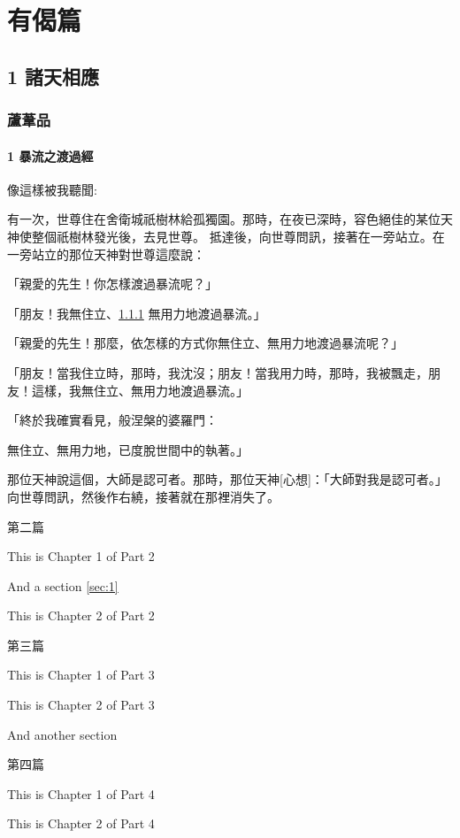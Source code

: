 \documentclass[a5paper,12pt]{book}
\begin{document}

\part[sort=有]{有偈篇}

\chapter{1 諸天相應}\label{ch:1-諸天相應}


\section{蘆葦品}\label{sec:蘆葦品}

\subsection{1 暴流之渡過經}\label{subsec:1}

像這樣被我聽聞:

有一次，世尊住在舍衛城祇樹林給孤獨園。那時，在夜已深時，容色絕佳的某位天神使整個祇樹林發光後，去見世尊。
抵達後，向世尊問訊，接著在一旁站立。在一旁站立的那位天神對世尊這麼說：

「親愛的先生！你怎樣渡過暴流呢？」

「朋友！我無住立、\ref{subsec:1} 無用力地渡過暴流。」

「親愛的先生！那麼，依怎樣的方式你無住立、無用力地渡過暴流呢？」

「朋友！當我住立時，那時，我沈沒；朋友！當我用力時，那時，我被飄走，朋友！這樣，我無住立、無用力地渡過暴流。」

「終於我確實看見，般涅槃的婆羅門：

無住立、無用力地，已度脫世間中的執著。」

那位天神說這個，大師是認可者。那時，那位天神[心想]：「大師對我是認可者。」向世尊問訊，然後作右繞，接著就在那裡消失了。

\clearpage

第二篇
This is Chapter 1 of Part 2
And a section \ref{sec:1}
\clearpage
This is Chapter 2 of Part 2
\clearpage

第三篇
This is Chapter 1 of Part 3
\clearpage
This is Chapter 2 of Part 3
And another section
\clearpage
第四篇
This is Chapter 1 of Part 4
\clearpage
This is Chapter 2 of Part 4
\clearpage
\end{document}
